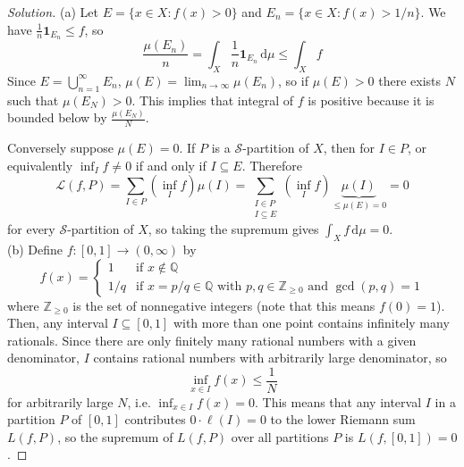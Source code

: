 \documentclass[10pt]{article}
\newcommand{\dd}{\,\mathrm{d}}
\providecommand{\QQ}{\mathbb Q}
\providecommand{\ZZ}{\mathbb Z}
\newenvironment{soln}{\begin{proof}[Solution]}{\end{proof}}
\begin{document}
\begin{soln}
    (a) Let $E = \{x\in X : f(x) > 0\}$ and $E_n = \{x\in X : f(x) > 1/n\}$.
    We have $\frac 1n\mathbf 1_{E_n}\le f$, so
    \begin{equation*}
	\frac{\mu(E_n)}n = \int_X \frac 1n\mathbf 1_{E_n}\dd\mu
	\le \int_Xf
    \end{equation*}
    Since $E = \bigcup_{n=1}^\infty E_n$, $\mu(E) = \lim_{n\to\infty}\mu(E_n)$,
    so if $\mu(E) > 0$ there exists $N$ such that $\mu(E_N) > 0$.
    This implies that integral of $f$ is positive because
    it is bounded below by $\frac{\mu(E_N)}{N}$.

    Conversely suppose $\mu(E) = 0$. If $P$ is a $\mathcal S$-partition of $X$,
    then for $I\in P$, or equivalently $\inf_I f \ne 0$ if and only if $I\subseteq E$.
    Therefore
    \begin{equation*}
	\mathcal L(f,P) = \sum_{I\in P} (\inf_If)\mu(I)
	= \sum_{\substack{I\in P\\ I\subseteq E}} (\inf_If)
	\underbrace{\mu(I)}_{\le \mu(E) = 0} = 0
    \end{equation*}
    for every $\mathcal S$-partition of $X$, so taking the supremum gives
    $\int_Xf\dd\mu = 0$.
    \\

    (b) Define $f\colon[0,1]\to(0,\infty)$ by
    \begin{equation*}
        f(x) = \begin{cases}
	    1 & \text{if }x\notin\QQ\\
	    1/q & \text{if }x=p/q\in\QQ
	    \text{ with }p,q\in\ZZ_{\ge0}\text{ and }\gcd(p,q)=1
        \end{cases}
    \end{equation*}
    where $\ZZ_{\ge0}$ is the set of nonnegative integers
    (note that this means $f(0) = 1$).
    Then, any interval $I\subseteq[0,1]$ with more than one point
    contains infinitely many rationals. Since there are only
    finitely many rational numbers with a given denominator,
    $I$ contains rational numbers with arbitrarily large denominator, so
    \begin{equation*}
	\inf_{x\in I} f(x) \le \frac 1N
    \end{equation*}
    for arbitrarily large $N$, i.e. $\inf_{x\in I}f(x) = 0$.
    This means that any interval $I$ in a partition $P$ of $[0,1]$
    contributes $0\cdot\ell(I) = 0$ to the lower Riemann sum $L(f,P)$,
    so the supremum of $L(f,P)$ over all partitions $P$ is $L(f,[0,1]) = 0$.


\end{soln}
\end{document}
